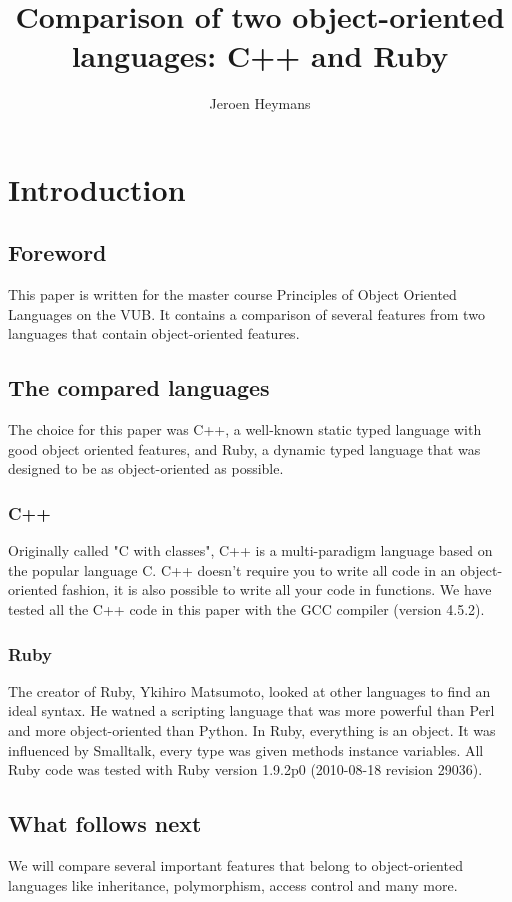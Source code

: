 \documentclass[10pt,a4paper,twocolumn]{article}
\author{Jeroen Heymans}
\title{Comparison of two object-oriented languages: C++ and Ruby}
\begin{document}
\maketitle

\section{Introduction}

\subsection{Foreword}
This paper is written for the master course Principles of Object Oriented Languages on the VUB. It contains a comparison of several features from two languages that contain object-oriented features. 

\subsection{The compared languages}
The choice for this paper was C++, a well-known static typed language with good object oriented features, and Ruby, a dynamic typed language that was designed to be as object-oriented as possible.

\subsubsection{C++}
Originally called "C with classes", C++ is a multi-paradigm language based on the popular language C. C++ doesn't require you to write all code in an object-oriented fashion, it is also possible to write all your code in functions. We have tested all the C++ code in this paper with the GCC compiler (version 4.5.2).

\subsubsection{Ruby}
The creator of Ruby, Ykihiro Matsumoto, looked at other languages to find an ideal syntax. He watned a scripting language that was more powerful than Perl and more object-oriented than Python. In Ruby, everything is an object. It was influenced by Smalltalk, every type was given methods instance variables. All Ruby code was tested with Ruby version 1.9.2p0 (2010-08-18 revision 29036).

\subsection{What follows next}
We will compare several important features that belong to object-oriented languages like inheritance, polymorphism, access control and many more.
\end{document}
